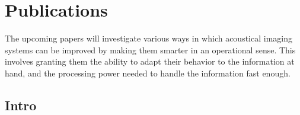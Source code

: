 
\endofdump

\ifRootBuild\else
  
  \makeglossaries
\fi




\chapter{Publications}
 
The upcoming papers will investigate various ways in which acoustical imaging systems can be improved by making them smarter in an operational sense. This involves granting them the ability to adapt their behavior to the information at hand, and the processing power needed to handle the information fast enough.

\section{Intro}\label{sec:intro} %


   

   

%
%
%
%
%

